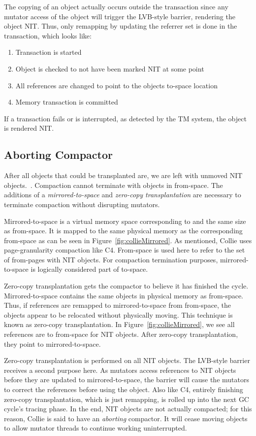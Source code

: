 \documentclass{sig-alternate}
\begin{document}
The copying of an object actually occurs outside the transaction since any
mutator access of the object will trigger the LVB-style barrier,
rendering the object NIT. Thus, only remapping by updating the referrer set
is done in the transaction, which looks like:
\begin{enumerate}
\item Transaction is started
\item Object is checked to not have been marked NIT at some point
\item All references are changed to point to the objects to-space location
\item Memory transaction is committed
\end{enumerate}
If a transaction fails or is interrupted, as detected by the TM system, the object is rendered NIT.


\subsection{Aborting Compactor}
\label{sec:collieAbortion}

After all objects that could be transplanted are, we
are left with unmoved NIT objects.~\cite{Iyengar:Collie}.
Compaction cannot terminate with objects in from-space.
The additions of a \emph{mirrored-to-space} and \emph{zero-copy transplantation} are necessary
to terminate compaction without disrupting mutators.

Mirrored-to-space is a virtual memory space corresponding to and the same
size as from-space. It is mapped to the same physical
memory as the corresponding from-space as can be seen in Figure~\ref{fig:collieMirrored}. As mentioned, 
Collie uses page-granularity compaction like C4. From-space is used here 
to refer to the set of from-pages with NIT objects. For compaction 
termination purposes, mirrored-to-space is logically considered part of to-space.

Zero-copy transplantation gets the compactor to believe it has finished the cycle.
Mirrored-to-space contains the same objects in physical memory as from-space.
Thus, if references
are remapped to mirrored-to-space from from-space,
the objects appear to be relocated without physically moving. This technique
is known as zero-copy transplantation. In Figure~\ref{fig:collieMirrored},
we see all references are to from-space for NIT objects. After zero-copy transplantation, they
point to mirrored-to-space.

Zero-copy transplantation
is performed on all NIT objects. The LVB-style barrier receives a second purpose here. As mutators
access references to NIT objects before they are updated to mirrored-to-space, 
the barrier will cause the mutators to correct the references before using the object. Also like
C4, entirely finishing zero-copy transplantation, which is just remapping, is rolled
up into the next GC cycle's tracing phase. In the end, NIT objects are not actually compacted;
for this reason, Collie is said to have an \emph{aborting} compactor. It will
cease moving objects to allow mutator threads to continue working uninterrupted.
\end{document}
